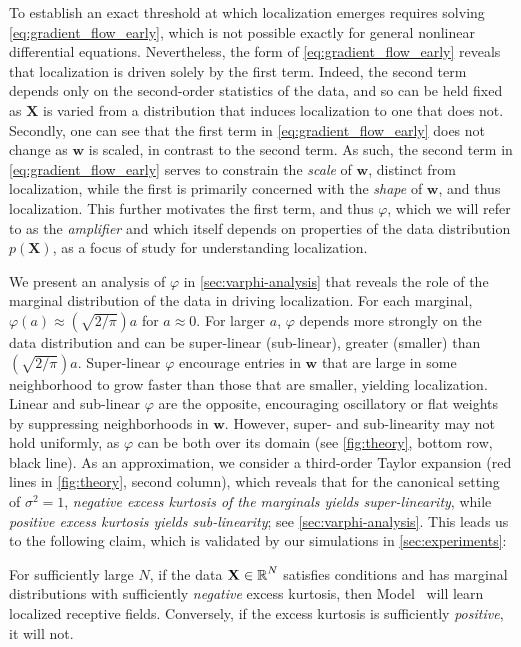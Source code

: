 To establish an exact threshold at which localization emerges requires solving \cref{eq:gradient_flow_early}, which is not possible exactly for general nonlinear differential equations.\smash{\footnotemark}
Nevertheless, the form of \cref{eq:gradient_flow_early} reveals that localization is driven solely by the first term. 
Indeed, the second term depends only on the second-order statistics of the data, and so can be held fixed as $\mathbf{X}$ is varied from a distribution that induces localization to one that does not.
Secondly, one can see that the first term in \cref{eq:gradient_flow_early} does not change as $\mathbf{w}$ is scaled, in contrast to the second term.
As such, the second term in \cref{eq:gradient_flow_early} serves to constrain the \emph{scale} of $\mathbf{w}$, distinct from localization, while the first is primarily concerned with the \emph{shape} of $\mathbf{w}$, and thus localization.
This further motivates the first term, and thus $\varphi$, 
which we will refer to as the \emph{amplifier} and which itself depends on properties of the data distribution $p(\mathbf{X})$,
as a focus of study for understanding localization.



We present an analysis of $\varphi$ in \cref{sec:varphi-analysis} that reveals the role of the marginal distribution of the data in driving localization.
For each marginal, $\varphi(a) \approx (\sqrt{2/\pi}) a$ for $a \approx 0$.
For larger $a$, $\varphi$ depends more strongly on the data distribution and can be super-linear (sub-linear), \ie greater (smaller) than $(\sqrt{2/\pi}) a$.
Super-linear $\varphi$ encourage entries in $\mathbf{w}$ that are large in some neighborhood to grow faster than those that are smaller, yielding localization.
Linear and sub-linear $\varphi$ are the opposite, encouraging oscillatory or flat weights by suppressing neighborhoods in $\mathbf{w}$.
However, super- and sub-linearity may not hold uniformly, as $\varphi$ can be both  over its domain (see \cref{fig:theory}, bottom row, black line).
As an approximation, we consider a third-order Taylor expansion (red lines in \cref{fig:theory}, second column), which reveals that for the canonical setting of $\sigma^2 = 1$, \emph{negative excess kurtosis of the marginals yields super-linearity}, while \emph{positive excess kurtosis yields sub-linearity};
see \cref{sec:varphi-analysis}.
This leads us to the following claim, which is validated by our simulations in \cref{sec:experiments}:
\begin{claim} \label{thm:localization}
    For sufficiently large $N$, if the data $\mathbf{X} \in \operatorname{\mathbb{R}}^N$ satisfies conditions  and has marginal distributions with sufficiently \emph{negative} excess kurtosis, then Model~ will learn localized receptive fields.
    Conversely, if the excess kurtosis is sufficiently \emph{positive}, it will not.
\end{claim}

